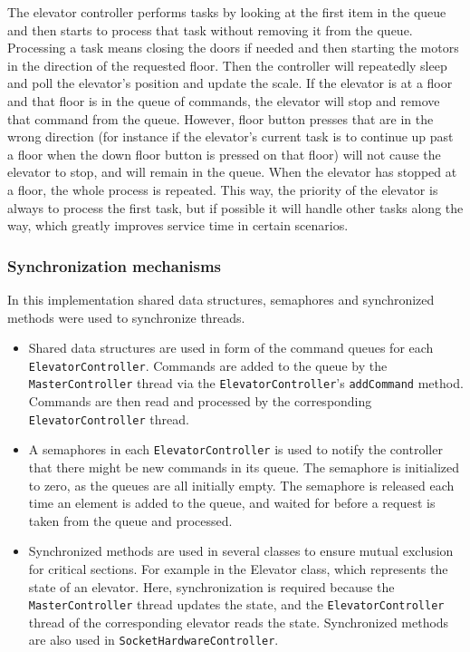 \documentclass[a4paper]{article}
\begin{document}
The elevator controller performs tasks by looking at the first item in the queue
and then starts to process that task without removing it from the queue.
Processing a task means closing the doors if needed and then starting the motors
in the direction of the requested floor. Then the controller will repeatedly
sleep and poll the elevator's position and update the scale. If the elevator is
at a floor and that floor is in the queue of commands, the elevator will stop
and remove that command from the queue. However, floor button presses that are
in the wrong direction (for instance if the elevator's current task is to
continue up past a floor when the down floor button is pressed on that floor)
will not cause the elevator to stop, and will remain in the queue. When the
elevator has stopped at a floor, the whole process is repeated. This way, the
priority of the elevator is always to process the first task, but if possible it
will handle other tasks along the way, which greatly improves service time in
certain scenarios.

\subsubsection{Synchronization mechanisms}
In this implementation shared data structures, semaphores and synchronized
methods were used to synchronize threads.

\begin{itemize}
\item Shared data structures are used in form of the command queues for each
    \texttt{ElevatorController}. Commands are added to the queue by the
    \texttt{MasterController} thread via the \texttt{ElevatorController}'s
    \texttt{addCommand} method. Commands are then read and processed by the
    corresponding \texttt{ElevatorController} thread.
\item A semaphores in each \texttt{ElevatorController} is used to notify the
    controller that there might be new commands in its queue. The semaphore is
    initialized to zero, as the queues are all initially empty. The semaphore is
    released each time an element is added to the queue, and waited for before a
    request is taken from the queue and processed.
\item Synchronized methods are used in several classes to ensure mutual
    exclusion for critical sections. For example in the Elevator class, which
    represents the state of an elevator. Here, synchronization is required
    because the \texttt{MasterController} thread updates the state, and the
    \texttt{ElevatorController} thread of the corresponding elevator reads the
    state. Synchronized methods are also used in
    \texttt{SocketHardwareController}.
\end{itemize}
\end{document}
